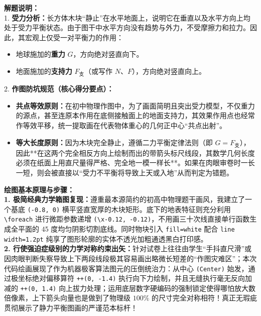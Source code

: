 \documentclass[12pt, a4paper]{ctexrep}
\begin{document}
\vspace{0.6cm}

{\small\color{gray}
\textbf{解题说明：}\\
1. \textbf{受力分析：}长方体木块“静止”在水平地面上，说明它在垂直以及水平方向上均处于受力平衡状态。由于图干中水平方向没有趋势与外力，不受摩擦力和拉力。因此，其宏观上仅受一对平衡力的作用：
\begin{itemize}
    \item 地球施加的\textbf{重力} $G$，方向绝对竖直向下。
    \item 地面施加的\textbf{支持力} $F_{\text{支}}$（或写作 $N$、$F$），方向绝对竖直向上。
\end{itemize}
2. \textbf{作图防坑规范（核心得分要点）：}
\begin{itemize}
    \item \textbf{共点等效原则：}在初中物理作图中，为了画面简明且突出受力模型，不仅重力的源点，甚至连原本作用在底侧接触面上的地面支持力，其效果作用点也经常作等效平移，统一提取画在代表物体重心的几何正中心“共点出射”。
    \item \textbf{等大长度原则：}因为木块完全静止，遵循二力平衡定律法则（即 $G = F_{\text{支}}$），因此**在这两个完全相反方向上绘制而出的带箭头标尺线段，其数学几何长度必须在纸面上用直尺量得严格、完全地一模一样长**。如果在肉眼审卷时一长一短，则会被直接以“受力不平衡将导致上天或入地”从而判定为错题。
\end{itemize}
}

\vspace{0.6cm}

{\small\color{blue!70!black}
\textbf{绘图基本原理与步骤：}\\
\textbf{1. 极简经典力学箱图复现：}遵重最本源简约的初高中物理题干画风，我建立了一个基底 \texttt{(-0.8, 0)} 横平竖直宽厚的木块矩形。底下的地表特征则充分利用 \texttt{\textbackslash foreach} 进行微距参数递增 \texttt{(\textbackslash x-0.12, -0.12)}，不用画三十次线直接单行函数生成全平面的 45 度均匀阴影切割底线。同时物块引入 \texttt{fill=white} 配合 \texttt{line width=1.2pt} 纯享了图形轮廓的实体不透光加粗通透黑白打印感。\\
\textbf{2. 行使强迫症级别的力学对称约束出矢：}针对试卷上往往由学生“手抖直尺滑”或因肉眼判断失察导致上下两段线段极其容易画出略微长短差的“作图灾难区”；本次代码绘画展现了作为机器极客算法图元的压倒统治力：从中心 \texttt{(Center)} 始发，通过极坐标绝对偏移算符 \texttt{++(0, -1.4)} 执行向下力绘制，并且无缝执行毫无反向加减的 \texttt{++(0, 1.4)} 向上拔力处理；运用底层数字硬编码的强制锁定使得哪怕放大数倍像素，上下箭头向量也是做到了物理级 $100\%$ 的尺寸完全对称相符！真正无瑕疵贯彻展示了静力平衡图画的严谨范本标杆！
}
\end{document}
